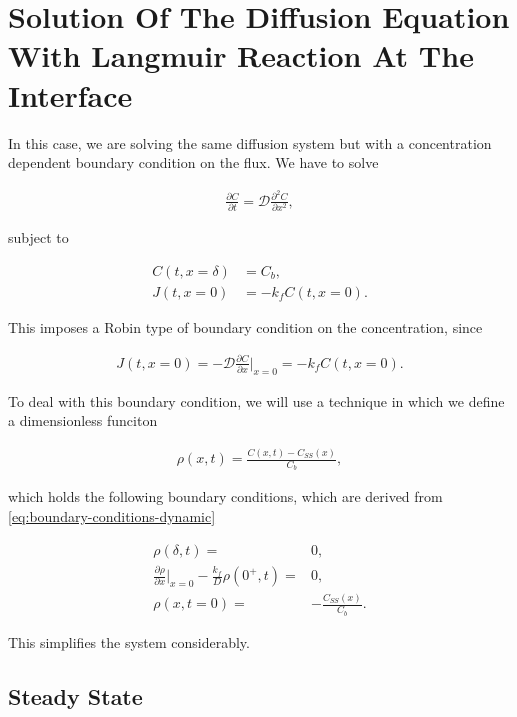 \section{Solution Of The Diffusion Equation With Langmuir Reaction At The Interface}
\label{appendix:analytic-langmuir}

In this case, we are solving the same diffusion system but with a concentration dependent boundary condition on the flux. We have to solve

\begin{align}
	\frac{\partial C}{\partial t} = \mathcal{D}\frac{\partial^2 C}{\partial x^2},
\end{align}

subject to

\begin{align}
	C(t, x=\delta) &= C_b,\\
	J(t,x=0) &= -k_fC(t,x=0).
\end{align}

This imposes a Robin type of boundary condition on the concentration, since

\begin{align}
	J(t,x=0) = -\mathcal{D} \frac{\partial C}{\partial x}\bigg|_{x=0}	= -k_f C(t, x=0).
\end{align}

To deal with this boundary condition, we will use a technique in which we define a dimensionless funciton

\begin{align}
\label{eq:dynamic-system-2}
	\rho(x, t) = \frac{C(x,t) - C_{SS}(x)}{C_b},
\end{align}


which holds the following boundary conditions, which are derived from \ref{eq:boundary-conditions-dynamic}



\begin{align}
			\rho(\delta, t) =& 0,\\
		\frac{\partial \rho}{\partial x}\big|_{x=0} -\frac{k_f}{D}\rho(0^+,t) =& 0,\\
		\rho(x, t=0) =& -\frac{C_{SS}(x)}{C_b}.
\end{align}

This simplifies the system considerably. 

\subsection{Steady State}
	
